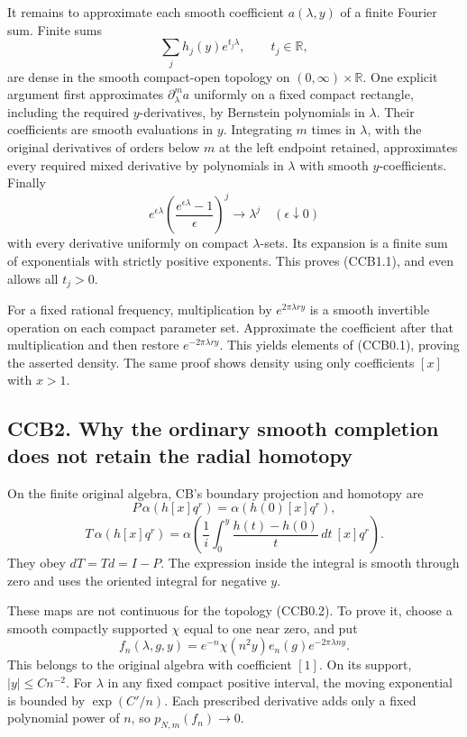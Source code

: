 It remains to approximate each smooth coefficient \(a(\lambda,y)\) of a
finite Fourier sum. Finite sums \[
\sum_j h_j(y)e^{t_j\lambda},\qquad t_j\in\mathbb R,
\tag{CCB1.1}
\] are dense in the smooth compact-open topology on
\((0,\infty)\times\mathbb R\). One explicit argument first approximates
\(\partial_\lambda^m a\) uniformly on a fixed compact rectangle,
including the required \(y\)-derivatives, by Bernstein polynomials in
\(\lambda\). Their coefficients are smooth evaluations in \(y\).
Integrating \(m\) times in \(\lambda\), with the original derivatives of
orders below \(m\) at the left endpoint retained, approximates every
required mixed derivative by polynomials in \(\lambda\) with smooth
\(y\)-coefficients. Finally \[
e^{\epsilon\lambda}
\left(\frac{e^{\epsilon\lambda}-1}{\epsilon}\right)^j
\longrightarrow\lambda^j\quad(\epsilon\downarrow0)
\] with every derivative uniformly on compact \(\lambda\)-sets. Its
expansion is a finite sum of exponentials with strictly positive
exponents. This proves (CCB1.1), and even allows all \(t_j>0\).

For a fixed rational frequency, multiplication by \(e^{2\pi\lambda ry}\)
is a smooth invertible operation on each compact parameter set.
Approximate the coefficient after that multiplication and then restore
\(e^{-2\pi\lambda ry}\). This yields elements of (CCB0.1), proving the
asserted density. The same proof shows density using only coefficients
\([x]\) with \(x>1\).

\subsection{CCB2. Why the ordinary smooth completion does not retain the
radial
homotopy}\label{ccb2.-why-the-ordinary-smooth-completion-does-not-retain-the-radial-homotopy}

On the finite original algebra, CB's boundary projection and homotopy
are \[
P\,\alpha(h[x]q^r)=\alpha(h(0)[x]q^r),
\] \[
T\,\alpha(h[x]q^r)=
\alpha\left(\frac1i\int_0^y\frac{h(t)-h(0)}t\,dt\ [x]q^r\right).
\tag{CCB2.1}
\] They obey \(dT=Td=I-P\). The expression inside the integral is smooth
through zero and uses the oriented integral for negative \(y\).

These maps are not continuous for the topology (CCB0.2). To prove it,
choose a smooth compactly supported \(\chi\) equal to one near zero, and
put \[
f_n(\lambda,g,y)
=e^{-n}\chi(n^2y)e_n(g)e^{-2\pi\lambda ny}.
\tag{CCB2.2}
\] This belongs to the original algebra with coefficient \([1]\). On its
support, \(|y|\le Cn^{-2}\). For \(\lambda\) in any fixed compact
positive interval, the moving exponential is bounded by \(\exp(C'/n)\).
Each prescribed derivative adds only a fixed polynomial power of \(n\),
so \(p_{N,m}(f_n)\to0\).

